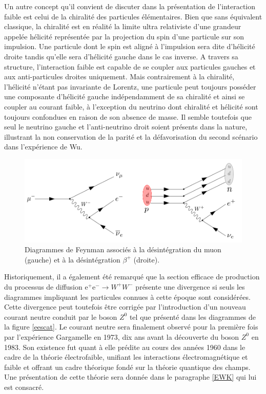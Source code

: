         Un autre concept qu'il convient de discuter dans la présentation de l'interaction faible est celui de la chiralité des particules élémentaires. Bien que sans équivalent classique, la chiralité est en réalité la limite ultra relativiste d'une grandeur appelée hélicité représentée par la projection du spin d'une particule sur son impulsion. Une particule dont le spin est aligné à l'impulsion sera dite d'hélicité droite tandis qu'elle sera d'hélicité gauche dans le cas inverse. A travers sa structure, l'interaction faible est capable de se coupler aux particules gauches et aux anti-particules droites uniquement. Mais contrairement à la chiralité, l'hélicité n'étant pas invariante de Lorentz, une particule peut toujours posséder une composante d'hélicité gauche indépendamment de sa chiralité et ainsi se coupler au courant faible, à l'exception du neutrino dont chiralité et hélicité sont toujours confondues en raison de son absence de masse. Il semble toutefois que seul le neutrino gauche et l'anti-neutrino droit soient présents dans la nature, illustrant la non conservation de la parité et la défavorisation du second scénario dans l'expérience de Wu. \\
        
        \begin{figure}
        \centering
            \includegraphics[scale=0.35]{Chapitre2/Images/wdecay.png} 
            \caption{Diagrammes de Feynman associés à la désintégration du muon (gauche) et à la désintégration $\beta^{+}$ (droite).}
        \label{wdecay}
        \end{figure}

        Historiquement, il a également été remarqué que la section efficace de production du processus de diffusion e$^+$e$^-\rightarrow W^+W^-$ présente une divergence si seuls les diagrammes impliquant les particules connues à cette époque sont considérées. Cette divergence peut toutefois être corrigée par l'introduction d'un nouveau courant neutre conduit par le boson $Z^0$ tel que présenté dans les diagrammes de la figure \ref{eescat}. Le courant neutre sera finalement observé pour la première fois par l'expérience Gargamelle en 1973, dix ans avant la découverte du boson $Z^0$ en 1983. Son existence fut quant à elle prédite au cours des années 1960 dans le cadre de la théorie électrofaible, unifiant les interactions électromagnétique et faible et offrant un cadre théorique fondé sur la théorie quantique des champs. Une présentation de cette théorie sera donnée dans le paragraphe \ref{EWK} qui lui est consacré.

